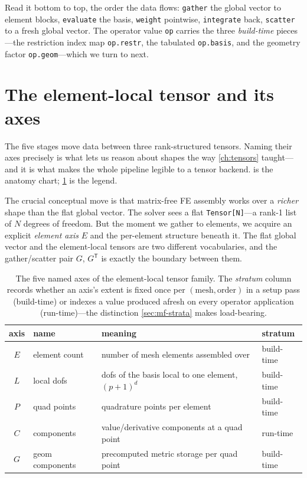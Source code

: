 \noindent Read it bottom to top, the order the data flows: \texttt{gather} the
global vector to element blocks, \texttt{evaluate} the basis, \texttt{weight}
pointwise, \texttt{integrate} back, \texttt{scatter} to a fresh global vector.
The operator value \texttt{op} carries the three \emph{build-time} pieces---the
restriction index map \texttt{op.restr}, the tabulated \texttt{op.basis}, and the
geometry factor \texttt{op.geom}---which we turn to next.

\section{The element-local tensor and its axes}
\label{sec:mf-anatomy}

The five stages move data between three rank-structured tensors. Naming their
axes precisely is what lets us reason about shapes the way \cref{ch:tensors}
taught---and it is what makes the whole pipeline legible to a tensor backend.
 is the anatomy chart; \cref{tab:mf-axes} is the legend.

The crucial conceptual move is that matrix-free FE assembly works over a
\emph{richer} shape than the flat global vector. The solver sees a flat
\lstinline[style=l4style]|Tensor[N]|---a rank-1 list of $N$ degrees of freedom.
But the moment we gather to elements, we acquire an explicit \emph{element axis}
$E$ and the per-element structure beneath it. The flat global vector and the
element-local tensors are two different vocabularies, and the gather/scatter pair
$G$, $G^{\mathsf T}$ is exactly the boundary between them.

\begin{table}[t]
\centering
\caption[The element-local tensor axes]{The five named axes of the element-local
tensor family. The \emph{stratum} column records whether an axis's extent is
fixed once per $(\text{mesh},\text{order})$ in a setup pass (build-time) or
indexes a value produced afresh on every operator application (run-time)---the
distinction \cref{sec:mf-strata} makes load-bearing.}
\label{tab:mf-axes}
\small
\setlength{\tabcolsep}{6pt}
\renewcommand{\arraystretch}{1.25}
\begin{tabular}{@{}clll@{}}
\toprule
axis & name & meaning & stratum \\
\midrule
$E$ & element count & number of mesh elements assembled over & build-time \\
$L$ & local dofs & dofs of the basis local to one element, $(p{+}1)^d$ & build-time \\
$P$ & quad points & quadrature points per element & build-time \\
$C$ & components & value/derivative components at a quad point & run-time \\
$G$ & geom components & precomputed metric storage per quad point & build-time \\
\bottomrule
\end{tabular}
\end{table}

